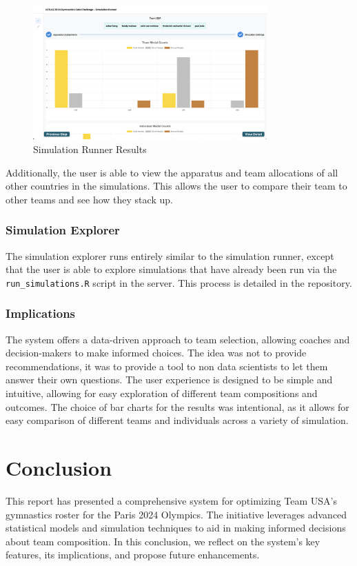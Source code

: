 \documentclass{article}
\begin{document}
\begin{figure}[H]
    \centering
    \includegraphics[width=0.8\textwidth]{./results_viewer.png}
    \caption{Simulation Runner Results}
    \label{fig:sim_results}
\end{figure}

\noindent Additionally, the user is able to view the apparatus and team allocations of all 
other countries in the simulations. This allows the user to compare their team
to other teams and see how they stack up.



\subsubsection{Simulation Explorer}

The simulation explorer runs entirely similar to the simulation runner, except that the user
is able to explore simulations that have already been run via the \texttt{run\_simulations.R} script in the server. This 
process is detailed in the repository.

\subsubsection{Implications}
The system offers a data-driven approach to team selection, allowing coaches and decision-makers to make informed choices. 
The idea was not to provide recommendations, it was to provide a tool to non data scientists to let them answer 
their own questions. The user experience is designed to be simple and intuitive, allowing for easy exploration of
different team compositions and outcomes. The choice of bar charts for the results was intentional, as it allows
for easy comparison of different teams and individuals across a variety of simulation.

\section{Conclusion}\label{sec:conclusion}
This report has presented a comprehensive system for optimizing Team USA's 
gymnastics roster for the Paris 2024 Olympics. The initiative leverages 
advanced statistical models and simulation techniques to aid in making informed 
decisions about team composition. In this conclusion, we reflect on the system's 
key features, its implications, and propose future enhancements.
\end{document}
